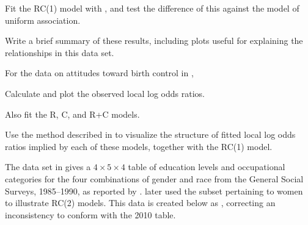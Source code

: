 \documentclass[10pt]{report}\usepackage[]{graphicx}\usepackage[]{color}
\begin{document}
\begin{Exercises}
\begin{enumerate*}
    \item Fit the RC(1) model with , and test the difference of
    this against the model of uniform association.
    \begin{ans}
    \end{ans}
    
    \item Write a brief summary of these results, including plots useful
    for explaining the relationships in this data set.
    \begin{ans}
    \end{ans}
    
  \end{enumerate*}
  
  \exercise For the data on attitudes toward birth control in ,
  \begin{enumerate*}
    \item Calculate and plot the observed local log odds ratios.
    \begin{ans}
    \end{ans}
    
    \item Also fit the R, C, and R+C models.
    \begin{ans}
    \end{ans}
    
    \item Use the method described in 
          to visualize the structure of fitted local log odds ratios implied by each of these models,
          together with the RC(1) model. 
    \begin{ans}
    \end{ans}
     
  \end{enumerate*}
  
  
  \exercise The data set  in  gives a $4 \times 5 \times 4$
  table of education levels and occupational categories for the four combinations
  of gender and race from the General Social Surveys, 1985--1990, as reported by
  \citet[Table 2]{Wong:2001}. \citet[Table 2.3B]{Wong:2010} later used the
  subset pertaining to women to illustrate RC(2) models.  This data is
  created below as , correcting an inconsistency to conform with
  the 2010 table.
  
  \begin{ans}
  \end{ans}
  
  


\end{Exercises}
\end{document}
